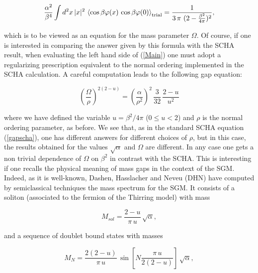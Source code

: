 \documentclass[a4paper,12pt]{article}
\begin{document}
\begin{equation} \label{Main}
\frac{\alpha^2}{\beta^4}\int d^2x\, |x|^2\, \left\langle
\cos\beta\varphi(x)\,\cos\beta\varphi(0) \right\rangle_{\text{trial}} = \frac{1}{3\,
\pi \,\,(2 - \frac{\beta^2}{4\pi})^2},
\end{equation}

\noindent which is to be viewed as an equation for the mass parameter $\Omega$. Of
course, if one is interested in comparing the answer given by this formula with the
SCHA result, when evaluating the left hand side of (\ref{Main}) one must adopt a
regularizing prescription equivalent to the normal ordering implemented in the SCHA
calculation. A careful computation leads to the following gap equation:

\begin{equation}\label{gapcga}
(\frac{\Omega}{\rho})^{2(2-u)}=(\frac{\alpha}{\rho^2})^2\,\frac{3}{32}\,\frac{2-u}{u^2}
\end{equation}

\noindent where we have defined the variable $u=\beta^2/4\pi$
($0\leq u <2$) and $\rho$ is the normal ordering parameter, as
before. We see that, as in the standard SCHA equation
(\ref{gapscha}), one has different answers for different choices
of $\rho$, but in this case, the results obtained for the values
$\sqrt{\alpha}$ and $\Omega$ are different. In any case one gets a
non trivial dependence of $\Omega$ on $\beta^2$ in contrast with
the SCHA. This is interesting if one recalls the physical meaning
of mass gaps in the context of the SGM. Indeed, as it is
well-known, Dashen, Hasslacher and Neveu (DHN) \cite{DHN} have
computed by semiclassical techniques the mass spectrum for the
SGM. It consists of a soliton (associated to the fermion of the
Thirring model) with mass

\begin{equation}\label{soliton}
M_{sol}=\frac{2-u}{\pi\,u}\,\sqrt{\alpha},
\end{equation}

\noindent and a sequence of doublet bound states with masses

\begin{equation}\label{doublets}
M_{N}=\frac{2(2-u)}{\pi\,u}\,\sin\left[N
\frac{\pi\,u}{2(2-u)}\right]\, \sqrt{\alpha},
\end{equation}
\end{document}

